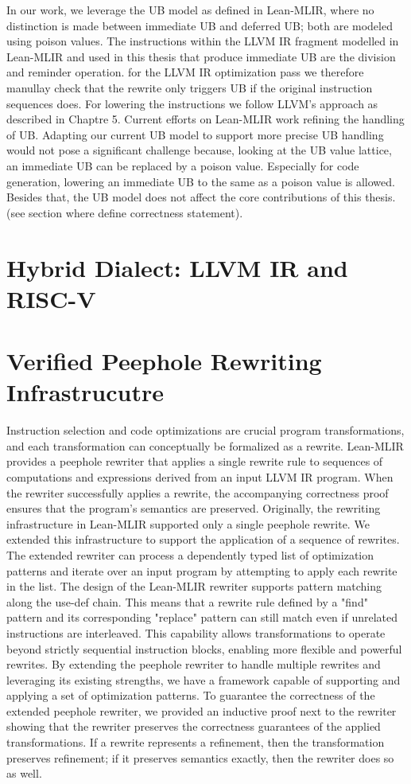 In our work, we leverage the UB model as defined in Lean-MLIR, where no distinction is made between immediate UB and deferred UB; both are modeled using poison values. The instructions within the LLVM IR  fragment modelled in Lean-MLIR and used in this thesis that produce immediate UB are the division and reminder operation. for the LLVM IR optimization pass we therefore manullay check that the rewrite only triggers UB if the original instruction sequences does. For lowering the instructions we follow LLVM's approach as described in Chaptre 5.  Current efforts on Lean-MLIR  work refining the handling of UB. Adapting our current UB model to support more precise UB handling would not pose a significant challenge because, looking at the UB value lattice, an immediate UB can be replaced by a poison value. Especially for code generation, lowering an immediate UB to the same as a poison value is allowed. Besides that, the UB model does not affect the core contributions of this thesis. (see section where define correctness statement).
\section{Hybrid Dialect: LLVM IR and RISC-V}


\section{Verified Peephole Rewriting Infrastrucutre }
Instruction selection and code optimizations are crucial program transformations, and each transformation can conceptually be formalized as a rewrite. Lean-MLIR provides a peephole rewriter that applies a single rewrite rule to sequences of computations and expressions derived from an input LLVM IR program. When the rewriter successfully applies a rewrite, the accompanying correctness proof ensures that the program's semantics are preserved.
Originally, the rewriting infrastructure in Lean-MLIR supported only a single peephole rewrite. We extended this infrastructure to support the application of a sequence of rewrites. The extended rewriter can process a dependently typed list of optimization patterns and iterate over an input program by attempting to apply each rewrite in the list.
The design of the Lean-MLIR rewriter supports pattern matching along the use-def chain. This means that a rewrite rule defined by a "find" pattern and its corresponding "replace" pattern can still match even if unrelated instructions are interleaved. This capability allows transformations to operate beyond strictly sequential instruction blocks, enabling more flexible and powerful rewrites.
By extending the peephole rewriter to handle multiple rewrites and leveraging its existing strengths, we have a framework capable of supporting and applying a set of optimization patterns.
To guarantee the correctness of the extended peephole rewriter, we provided an inductive proof next to the rewriter showing that the rewriter preserves the correctness guarantees of the applied transformations. If a rewrite represents a refinement, then the transformation preserves refinement; if it preserves semantics exactly, then the rewriter does so as well.

